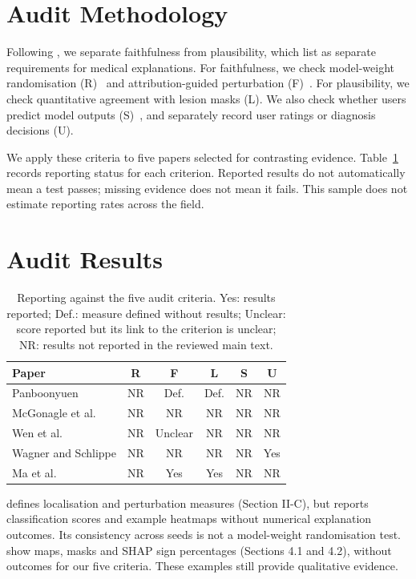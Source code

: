 \documentclass[conference]{IEEEtran}
\renewcommand{\cite}{\citep}
\begin{document}
\section{Audit Methodology}
\label{sec:audit-framework}
Following \citet{jacovi2020faithfulness}, we separate faithfulness from plausibility, which \citet{hou2024sxai} list as separate requirements for medical explanations. For faithfulness, we check model-weight randomisation (R)~\cite{adebayo2018sanity} and attribution-guided perturbation (F)~\cite{petsiuk2018rise}. For plausibility, we check quantitative agreement with lesion masks (L). We also check whether users predict model outputs (S)~\cite{akula2022cxtom}, and separately record user ratings or diagnosis decisions (U).

We apply these criteria to five papers selected for contrasting evidence. Table~\ref{tab:audit} records reporting status for each criterion. Reported results do not automatically mean a test passes; missing evidence does not mean it fails. This sample does not estimate reporting rates across the field.

\section{Audit Results}
\label{sec:audit-results}
\begin{table}[!ht]
\centering
\caption{Reporting against the five audit criteria. Yes: results reported; Def.: measure defined without results; Unclear: score reported but its link to the criterion is unclear; NR: results not reported in the reviewed main text.}
\label{tab:audit}
\small
\setlength{\tabcolsep}{3pt}
\begin{tabular}{lccccc}
\hline
Paper & R & F & L & S & U \\
\hline
Panboonyuen & NR & Def. & Def. & NR & NR \\
McGonagle et al. & NR & NR & NR & NR & NR \\
Wen et al. & NR & Unclear & NR & NR & NR \\
Wagner and Schlippe & NR & NR & NR & NR & Yes \\
Ma et al. & NR & Yes & Yes & NR & NR \\
\hline
\end{tabular}
\end{table}

\citet{panboonyuen2026seeing} defines localisation and perturbation measures (Section II-C), but reports classification scores and example heatmaps without numerical explanation outcomes. Its consistency across seeds is not a model-weight randomisation test. \citet{mcgonagle2026combined} show maps, masks and SHAP sign percentages (Sections 4.1 and 4.2), without outcomes for our five criteria. These examples still provide qualitative evidence.
\end{document}
